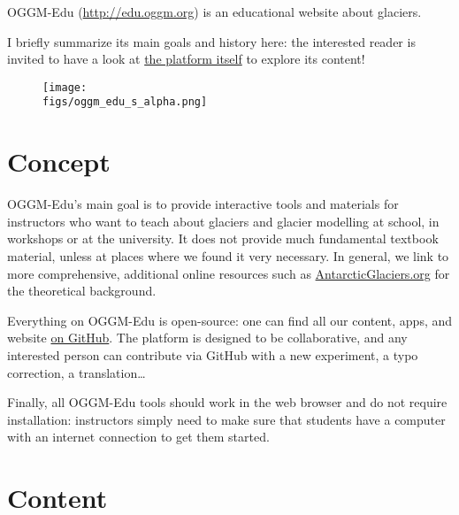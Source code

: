 OGGM-Edu (\href{http://edu.oggm.org}{http://edu.oggm.org}) is an educational website about glaciers.

I briefly summarize its main goals and history here: the interested reader is invited to have a look at
\href{https://edu.oggm.org}{the platform itself} to explore its content!

\begin{figure}[h]
\texttt{[image: \\figs/oggm\_edu\_s\_alpha.png]}
\end{figure}


\section{Concept}

OGGM-Edu’s main goal is to provide interactive tools and materials for instructors who want to
teach about glaciers and glacier modelling at school, in workshops or at the university.
It does not provide much fundamental textbook material, unless at places where we found it very necessary.
In general, we link to more comprehensive, additional online resources such as
\href{http://www.antarcticglaciers.org/}{AntarcticGlaciers.org} for the theoretical background.

Everything on OGGM-Edu is open-source: one can find all our content, apps, and website \href{https://github.com/OGGM/oggm-edu}{on GitHub}.
The platform is designed to be collaborative, and any interested person can contribute via GitHub with a new experiment,
a typo correction, a translation…

Finally, all OGGM-Edu tools should work in the web browser and do not require installation: instructors simply need to
make sure that students have a computer with an internet connection to get them started.


\section{Content}


